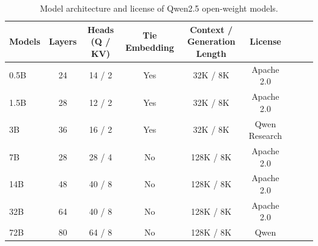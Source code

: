 \begin{table}[tbp]
\caption{Model architecture and license of Qwen2.5 open-weight models.}
\small
\centering
\begin{tabular}{@{}lcccccccc@{}} 
\toprule
Models  & Layers & Heads (Q / KV) & Tie Embedding & Context / Generation Length  & License \\
\midrule
0.5B  & 24 & 14 / 2 & Yes & 32K / 8K & Apache 2.0 \\
1.5B  & 28 & 12 / 2 & Yes & 32K / 8K & Apache 2.0 \\
3B  & 36 & 16 / 2 & Yes & 32K / 8K & Qwen Research \\
7B  & 28 & 28 / 4 & No & 128K / 8K & Apache 2.0 \\
14B & 48 & 40 / 8 & No & 128K / 8K & Apache 2.0 \\
32B & 64 & 40 / 8 & No & 128K / 8K & Apache 2.0 \\
72B  & 80 & 64 / 8 & No & 128K / 8K & Qwen \\
\bottomrule
\end{tabular}
\end{table}
